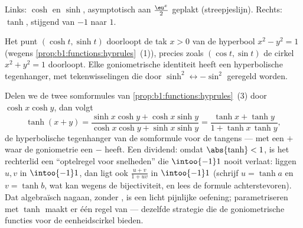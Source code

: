 \begin{omfigure}

{\small Links: $\cosh$ en $\sinh$, asymptotisch aan $\frac{\eu^x}{2}$
geplakt (streepjeslijn). Rechts: $\tanh$, stijgend van $-1$ naar $1$.}
\end{omfigure}

\begin{remark}
Het punt $(\cosh t, \sinh t)$ doorloopt de tak $x > 0$ van de hyperbool
$x^2 - y^2 = 1$ (wegens
\cref{prop:b1:functions:hyprules}~(1)), precies zoals $(\cos t, \sin
t)$ de cirkel $x^2 + y^2 = 1$ doorloopt. Elke goniometrische identiteit
heeft een hyperbolische tegenhanger, met tekenwisselingen die door
$\sinh^2 \leftrightarrow -\sin^2$ geregeld worden.
\end{remark}

\begin{example}\label{ex:b1:functions:tanhadd}
Delen we de twee somformules van
\cref{prop:b1:functions:hyprules}~(3) door $\cosh x\cosh y$, dan volgt
\[
\tanh(x + y)
= \frac{\sinh x\cosh y + \cosh x\sinh y}
{\cosh x\cosh y + \sinh x\sinh y}
= \frac{\tanh x + \tanh y}{1 + \tanh x\,\tanh y} ,
\]
de hyperbolische tegenhanger van de somformule voor de tangens --- met
een $+$ waar de goniometrie een $-$ heeft. Een dividend: omdat
$\abs{\tanh} < 1$, is het rechterlid een ``optelregel voor snelheden''
die $\intoo{-1}1$ nooit verlaat: liggen $u, v$ in $\intoo{-1}1$, dan
ligt ook $\frac{u + v}{1 + uv}$ in $\intoo{-1}1$ (schrijf $u = \tanh a$
en $v = \tanh b$, wat kan wegens de bijectiviteit, en lees de formule
achterstevoren). Dat algebraïsch nagaan, zonder ,
is een licht pijnlijke oefening; parametriseren met $\tanh$ maakt er één
regel van --- dezelfde strategie die de goniometrische functies voor de
eenheidscirkel bieden.
\end{example}

